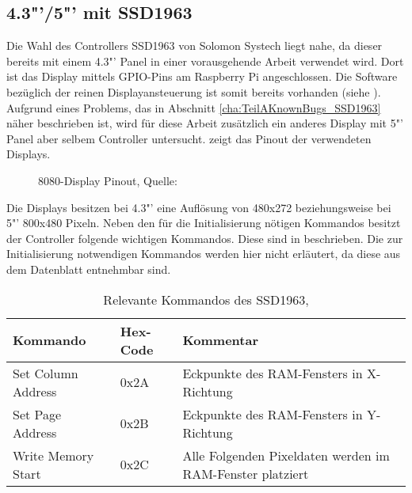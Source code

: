 \subsection{4.3"'/5"' mit SSD1963}
Die Wahl des Controllers SSD1963 von Solomon Systech liegt nahe, da dieser bereits mit einem 4.3"'  Panel in einer vorausgehende Arbeit verwendet wird. Dort ist das Display mittels GPIO-Pins am Raspberry Pi angeschlossen. Die Software bezüglich der reinen Displayansteuerung ist somit bereits vorhanden (siehe \cite{Schlegel2013}). Aufgrund eines Problems, das in Abschnitt \ref{cha:TeilAKnownBugs_SSD1963} näher beschrieben ist, wird für diese Arbeit zusätzlich ein anderes Display mit 5"' Panel aber selbem Controller untersucht. 
 zeigt das Pinout der verwendeten Displays.
\begin{figure}[h]
	\centering
{}
	\caption{8080-Display Pinout, Quelle: \cite{Coldtears2014}}
	\label{fig:8080_pinout}
\end{figure}
Die Displays besitzen bei 4.3"' eine Auflösung von 480x272 beziehungsweise bei 5"' 800x480 Pixeln. Neben den für die Initialisierung nötigen Kommandos besitzt der Controller folgende wichtigen Kommandos. Diese sind in  beschrieben. Die zur Initialisierung notwendigen Kommandos werden hier nicht erläutert, da diese aus dem Datenblatt entnehmbar sind.
\begin{table}[h]
\begin{tabular}{|p{4cm}|p{1cm}|p{8cm}|}\hline
\rowcolor{TableBackgroundColor} 
   \textbf{Kommando} & \textbf{Hex-Code} & \textbf{Kommentar}\\ \hline
   Set Column Address & 0x2A & Eckpunkte des RAM-Fensters in X-Richtung \\ \hline
   Set Page Address & 0x2B & Eckpunkte des RAM-Fensters in Y-Richtung \\ \hline
   Write Memory Start & 0x2C & Alle Folgenden Pixeldaten werden im RAM-Fenster platziert \\ \hline
\end{tabular}
\caption{Relevante Kommandos des SSD1963, \cite{SSD2008}}
\label{tab:Kommandos_SSD1963}
\end{table}


